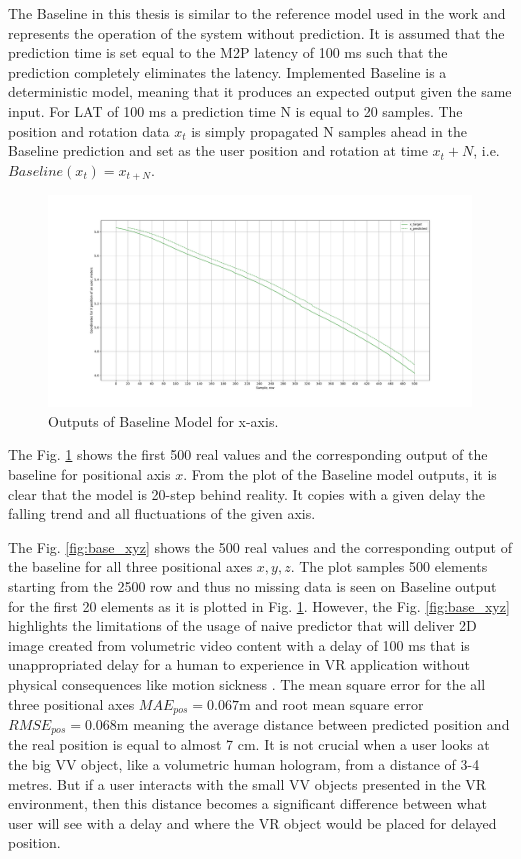 The Baseline in this thesis is similar to the reference model used in the work \cite{serhan_kalman} and represents the operation of the system without prediction. It is assumed that the prediction time is set equal to the M2P latency of 100 ms such that the prediction completely eliminates the latency. Implemented Baseline is a deterministic model, meaning that it produces an expected output given the same input. For LAT of 100 ms a prediction time N is equal to 20 samples. The position and rotation data $x_t$ is simply propagated N samples ahead in the Baseline prediction and set as the user position and rotation at time $x_t + N$, i.e. $Baseline(x_t) = x_{t+N}$. 
\begin{figure}[htb]
	\begin{center}
		\includegraphics[width=1\textwidth, keepaspectratio]{gfx/base_zoom-x.pdf}
		\caption{\label{fig:base_x} Outputs of Baseline Model for x-axis.}
	\end{center}
\end{figure}

The Fig. \ref{fig:base_x} shows the first 500 real values and the corresponding output of the baseline for positional axis $x$. From the plot of the Baseline model outputs, it is clear that the model is 20-step behind reality. It copies with a given delay the falling trend and all fluctuations of the given axis.

The Fig. \ref{fig:base_xyz} shows the 500 real values and the corresponding output of the baseline for all three positional axes $x, y, z$. The plot samples 500 elements starting from the 2500 row and thus no missing data is seen on Baseline output for the first 20 elements as it is plotted in Fig. \ref{fig:base_x}. However, the Fig. \ref{fig:base_xyz} highlights the limitations of the usage of naive predictor that will deliver 2D image created from volumetric video content with a delay of 100 ms that is unappropriated delay for a human to experience in VR application without physical consequences like motion sickness \cite{delay_sickness}. The mean square error for the all three positional axes $MAE_{pos} = 0.067$m and root mean square error  $RMSE_{pos} = 0.068$m meaning the average distance between predicted position and the real position is equal to almost 7 cm. It is not crucial when a user looks at the big VV object, like a volumetric human hologram, from a distance of 3-4 metres. But if a user interacts with the small VV objects presented in the VR environment, then this distance becomes a significant difference between what user will see with a delay and where the VR object would be placed for delayed position.

